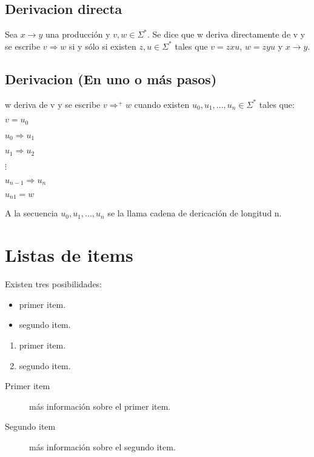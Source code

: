 \subsection{Derivacion directa}
Sea $x\rightarrow y$ una producción y $v,w\in\Sigma^{*}$. Se dice que w deriva directamente de v y se escribe $v\Rightarrow w$ si y sólo si existen $z,u\in\Sigma^{*}$ tales que $v=zxu$, $w=zyu$ y $x\rightarrow y$. 
\subsection{Derivacion (En uno o más pasos)}

w deriva de v y se escribe $v\Rightarrow^{+}w$ cuando existen $u_{0},u_{1},...,u_{n}\in\Sigma^{*}$ tales que:

$v=u_{0}$

$u_{0}\Rightarrow u_{1}$

$u_{1}\Rightarrow u_{2}$

$\vdots$

$u_{n-1}\Rightarrow u_{n}$

$u_{n1}=w$

A la secuencia $u_{0},u_{1},...,u_{n}$ se la llama cadena de dericación de longitud n.













\section{Listas de items}

Existen tres posibilidades:

\begin{itemize}
	\item primer item.
	\item segundo item.
\end{itemize}

\begin{enumerate}
	\item primer item.
	\item segundo item.
\end{enumerate}

\begin{description}
	\item[Primer item] más información sobre el primer item.
	\item[Segundo item] más información sobre el segundo item.
\end{description}
	


